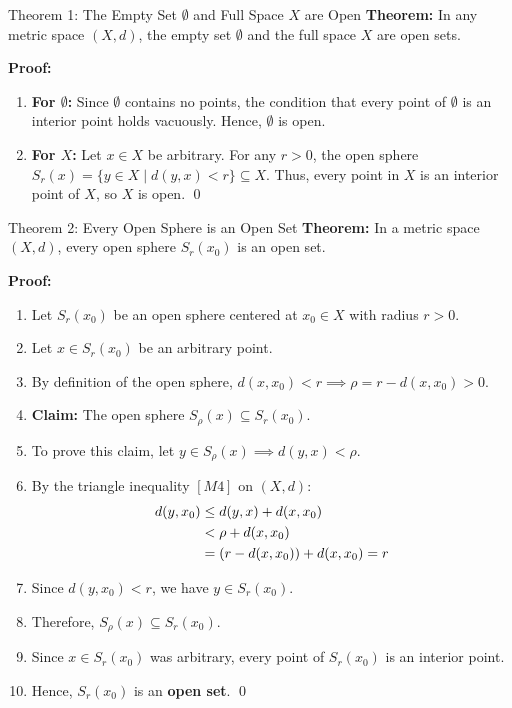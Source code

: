 \documentclass[11pt,a4paper]{article}
\begin{document}
\begin{exbox}{Theorem 1: The Empty Set $\emptyset$ and Full Space $X$ are Open}
\textbf{Theorem:} In any metric space $(X, d)$, the empty set $\emptyset$ and the full space $X$ are open sets.

\textbf{Proof:}
\begin{enumerate}
    \item \textbf{For $\emptyset$:} Since $\emptyset$ contains no points, the condition that every point of $\emptyset$ is an interior point holds vacuously. Hence, $\emptyset$ is open.
    \item \textbf{For $X$:} Let $x \in X$ be arbitrary. For any $r > 0$, the open sphere $S_r(x) = \{ y \in X \mid d(y, x) < r \} \subseteq X$. Thus, every point in $X$ is an interior point of $X$, so $X$ is open. \qed
\end{enumerate}
\end{exbox}

\begin{exbox}{Theorem 2: Every Open Sphere is an Open Set}
\textbf{Theorem:} In a metric space $(X, d)$, every open sphere $S_r(x_0)$ is an open set.

\textbf{Proof:}
\begin{enumerate}
    \item Let $S_r(x_0)$ be an open sphere centered at $x_0 \in X$ with radius $r > 0$.
    \item Let $x \in S_r(x_0)$ be an arbitrary point.
    \item By definition of the open sphere, $d(x, x_0) < r \implies \rho = r - d(x, x_0) > 0$.
    \item \textbf{Claim:} The open sphere $S_\rho(x) \subseteq S_r(x_0)$.
    \item To prove this claim, let $y \in S_\rho(x) \implies d(y, x) < \rho$.
    \item By the triangle inequality $[M4]$ on $(X, d)$:
    \begin{align}
        d(y, x_0) &\le d(y, x) + d(x, x_0) \notag \\
        &< \rho + d(x, x_0) \notag \\
        &= (r - d(x, x_0)) + d(x, x_0) = r
    \end{align}
    \item Since $d(y, x_0) < r$, we have $y \in S_r(x_0)$.
    \item Therefore, $S_\rho(x) \subseteq S_r(x_0)$.
    \item Since $x \in S_r(x_0)$ was arbitrary, every point of $S_r(x_0)$ is an interior point.
    \item Hence, $S_r(x_0)$ is an \textbf{open set}. \qed
\end{enumerate}
\end{exbox}
\end{document}
